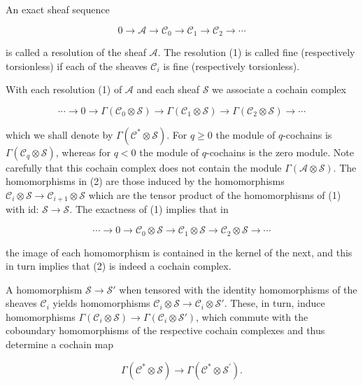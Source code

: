 \begin{definition}\label{thm:5.19}
An exact sheaf sequence

\begin{equation}
\tag{1}\label{eq:5.19:1}
0\to\mathcal{A}\to\mathcal{C}_{0}\to\mathcal{C}_{1}\to\mathcal{C}_{2}\to\cdots
\end{equation}

is called a resolution of the sheaf $\mathcal{A}$. The resolution (1) is called fine (respectively torsionless) if each of the sheaves $\mathcal{C}_{i}$ is fine (respectively torsionless). 

With each resolution (1) of $\mathcal{A}$ and each sheaf $\mathcal{S}$ we associate a cochain complex

\begin{equation}
\tag{2}\label{eq:5.19:2}
\cdots\to0\to\Gamma(\mathcal{C}_{0}\otimes\mathcal{S})\to\Gamma(\mathcal{C}_{1}\otimes\mathcal{S})\to\Gamma(\mathcal{C}_{2}\otimes\mathcal{S})\to\cdots
\end{equation}

which we shall denote by $\Gamma(\mathcal{C}^*\otimes\mathcal{S})$. For $q\geq0$ the module of $q$-cochains is $\Gamma(\mathcal{C}_q\otimes\mathcal{S})$, whereas for $q<0$ the module of $q$-cochains is the zero module. Note carefully that this cochain complex does not contain the module $\Gamma(\mathcal{A}\otimes\mathcal{S})$. The homomorphisms in (2) are those induced by the homomorphisms $\mathcal{C}_i\otimes\mathcal{S}\to\mathcal{C}_{i+1}\otimes\mathcal{S}$ which are the tensor product of the homomorphisms of (1) with id: $\mathcal{S}\to\mathcal{S}$. The exactness of (1) implies that in

\begin{equation}
\tag{3}\label{eq:5.19:3}
\cdots\to0\to\mathcal{C}_{0}\otimes\mathcal{S}\to\mathcal{C}_{1}\otimes\mathcal{S}\to\mathcal{C}_{2}\otimes\mathcal{S}\to\cdots
\end{equation}

the image of each homomorphism is contained in the kernel of the next, and this in turn implies that (2) is indeed a cochain complex.

A homomorphism $\mathcal{S} \to \mathcal{S}'$ when tensored with the identity homomorphisms of the sheaves $\mathcal{C}_i$ yields homomorphisms $\mathcal{C}_i \otimes \mathcal{S} \to \mathcal{C}_i \otimes \mathcal{S}'$. These, in turn, induce homomorphisms $\Gamma(\mathcal{C}_i \otimes \mathcal{S}) \to \Gamma(\mathcal{C}_i \otimes \mathcal{S}')$, which commute with the coboundary homomorphisms of the respective cochain complexes and thus determine a cochain map

\begin{equation}
\tag{4}\label{eq:5.19:4}
\Gamma(\mathcal{C}^{*}\otimes\mathcal{S})\to\Gamma(\mathcal{C}^{*}\otimes\mathcal{S}^{\prime}).
\end{equation}

\end{definition}

